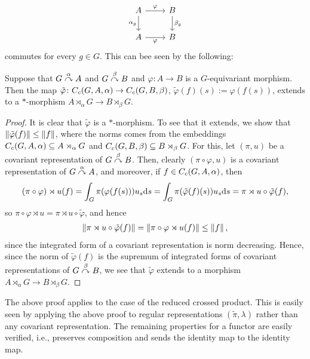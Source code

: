 \begin{equation}
	\begin{tikzcd}
		A \arrow[r, "\varphi"] \arrow[d, "\alpha_g"'] & B  \arrow[d, "\beta_g"]\\
		A \arrow[r, "\varphi"'] & B
	\end{tikzcd}
\end{equation}
commutes for every $g \in G$. This can bee seen by the following:
\begin{proposition}
	Suppose that $G \stackrel{\alpha}{\curvearrowright} A$ and $G \stackrel{\beta}{\curvearrowright} B$ and $\varphi \colon A \to B$ is a $G$-equivariant morphism. Then the map $\tilde \varphi \colon C_c(G,A,\alpha) \to C_c(G,B,\beta)$, $\tilde \varphi (f)(s) := \varphi(f(s))$, extends to a $*$-morphism $A \rtimes_\alpha G \to B \rtimes_\beta G$.
\end{proposition}
\begin{proof}
	It is clear that $\tilde \varphi$ is a $*$-morphism. To see that it extends, we show that $\left\lVert \tilde \varphi(f) \right\rVert \leq \left\lVert f \right\rVert$, where the norms comes from the embeddings $C_c(G,A,\alpha) \subseteq A \rtimes_\alpha G$ and $C_c(G,B,\beta) \subseteq B \rtimes_\beta G$. For this, let $(\pi,u)$ be a covariant representation of $G \stackrel{\beta}{\curvearrowright} B$. Then, clearly $(\pi \circ \varphi , u)$ is a covariant representation of $G \stackrel{\alpha}{\curvearrowright} A$, and moreover, if $f \in C_c(G,A,\alpha)$, then
	\begin{align*}
		(\pi \circ \varphi) \rtimes u(f) = \int_G \pi(\varphi(f(s))) u_s \mathrm{d} s = \int _G \pi (\tilde \varphi(f)(s)) u_s \mathrm{d} s  =  \pi \rtimes u \circ \tilde \varphi (f),
	\end{align*}
	so $\pi \circ \varphi \rtimes u = \pi \rtimes u \circ \tilde \varphi$, and hence 
	\begin{align*}
		\left\lVert \pi \rtimes u \circ \tilde \varphi(f)\right\rVert = \left\lVert \pi \circ \varphi \rtimes u (f) \right\rVert \leq \left\lVert f \right\rVert,
	\end{align*}
	since the integrated form of a covariant representation is norm decreasing. Hence, since the norm of $ \tilde \varphi(f)$ is the supremum of integrated forms of covariant representations of $G \stackrel{\beta}{\curvearrowright} B$, we see that $\tilde \varphi$ extends to a morphism $A \rtimes_\alpha G \to B \rtimes_\beta G$.
\end{proof}
The above proof applies to the case of the reduced crossed product. This is easily seen by applying the above proof to regular representations $(\tilde \pi, \lambda)$ rather than any covariant representation. The remaining properties for a functor are easily verified, i.e., preserves composition and sends the identity map to the identity map.

